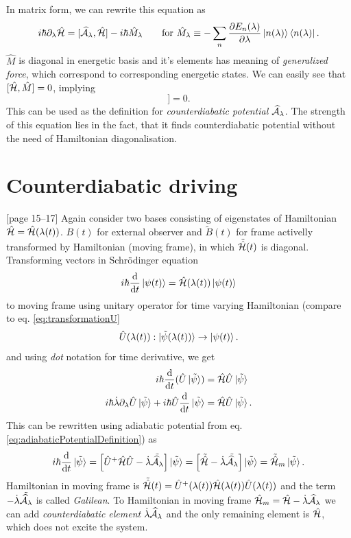 In matrix form, we can rewrite this equation as
\begin{equation}
    i\hbar\partial_\lambda\HH=[\AA_\lambda,\HH]-i\hbar \hat{M}_\lambda\qquad \text{for } \hat{M}_\lambda\equiv -\sum_n\pder{E_n(\lambda)}{\lambda}\ket{n(\lambda)}\bra{n(\lambda)}.
\end{equation}
$\hat{M}$ is diagonal in energetic basis and it's elements has meaning of \emph{generalized force}, which correspond to corresponding energetic states. We can easily see that $[\HH,\hat{M}]=0$, implying
\begin{equation}
    [\HH,i\hbar\partial_\lambda\HH-[\AA_\lambda,\HH]]=0.
    \label{eq:komutation}
\end{equation}
This can be used as the definition for \emph{counterdiabatic potential} $\AA_\lambda$. The strength of this equation lies in the fact, that it finds counterdiabatic potential without the need of Hamiltonian diagonalisation.

\section{Counterdiabatic driving}
\citep{kolodrubez}[page 15--17]
Again consider two bases consisting of eigenstates of Hamiltonian $\HH=\HH(\lambda(t))$. $B(t)$ for external observer and $\tilde B(t)$ for frame activelly transformed by Hamiltonian (moving frame), in which $\tilde \HH(t)$ is diagonal. Transforming vectors in Schrödinger equation
\begin{equation}
    i\hbar \der{}{t}\ket{\psi(t)} = \HH(\lambda(t))\ket{\psi(t)}
\end{equation}
to moving frame using unitary operator for time varying Hamiltonian (compare to eq. \ref{eq:transformationU}
\begin{equation}
    \U(\lambda(t)): \ket{\tilde\psi(\lambda(t))} \rightarrow \ket{\psi(t)}.
    \label{eq:transformationUtimeDependentH}
\end{equation}
and using \emph{dot} notation for time derivative, we get
\begin{align}
    i\hbar \der{}{t}(\U\ket{\tilde \psi}) &= \HH\U\ket{\tilde \psi} \\
    i\hbar \dot \lambda\partial_\lambda\U\ket{\tilde \psi} + i\hbar \U\der{}{t}\ket{\tilde \psi} &= \HH\U\ket{\tilde \psi}.
\end{align}
This can be rewritten using adiabatic potential from eq. \ref{eq:adiabaticPotentialDefinition}) as
\begin{equation}
    i\hbar \der{}{t}\ket{\tilde{\psi}} = \left[\U^+\HH\U-\dot{\lambda}\tilde{\AA_\lambda}\right]\ket{\tilde{\psi}} = \left[\tilde \HH-\dot{\lambda}\tilde{\AA_\lambda}\right]\ket{\tilde{\psi}} = \tilde{\HH}_m \ket{\tilde{\psi}}.
\end{equation}
Hamiltonian in moving frame is $\tilde\HH(t)=\U^+(\lambda(t))\HH(\lambda(t))\U(\lambda(t))$ and the term $-\dot{\lambda}\tilde{\AA_\lambda}$ is called \emph{Galilean}. To Hamiltonian in moving frame $\HH_m = \HH-\dot{\lambda}\AA_\lambda$ we can add \emph{counterdiabatic element} $\dot{\lambda}\AA_\lambda$ and the only remaining element is $\HH$, which does not excite the system.

